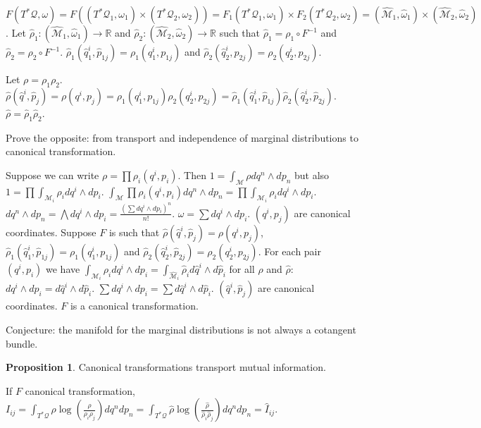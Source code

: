 \documentclass[smallextended]{svjour3}
\numberwithin{equation}{section}
\theoremstyle{definition}
\newtheorem{prop}[equation]{Proposition}
\begin{document}
$F(T^*\mathcal{Q}, \omega) = F((T^*\mathcal{Q}_1, \omega_1) \times (T^*\mathcal{Q}_2, \omega_2)) = F_1(T^*\mathcal{Q}_1, \omega_1) \times F_2(T^*\mathcal{Q}_2, \omega_2) = (\hat{\mathcal{M}}_1, \hat{\omega}_1) \times (\hat{\mathcal{M}}_2, \hat{\omega}_2)$.
Let $\hat{\rho}_1 : (\hat{\mathcal{M}}_1, \hat{\omega}_1) \rightarrow \mathbb{R}$ and $\hat{\rho}_2 : (\hat{\mathcal{M}}_2, \hat{\omega}_2) \rightarrow \mathbb{R}$ such that $\hat{\rho}_1 = \rho_1 \circ F^{-1 }$ and $\hat{\rho}_2 = \rho_2 \circ F^{-1 }$.  $\hat{\rho}_1(\hat{q}_1^i, \hat{p}_{1j})=\rho_1(q_1^i, p_{1j})$ and $\hat{\rho}_2(\hat{q}_2^i, \hat{p}_{2j})=\rho_2(q_2^i, p_{2j})$.

Let $\rho=\rho_1\rho_2$. $\hat{\rho}(\hat{q}^i, \hat{p}_j) =\rho(q^i, p_j)=\rho_1(q_1^i, p_{1j})\rho_2(q_2^i, p_{2j})=\hat{\rho}_1(\hat{q}_1^i, \hat{p}_{1j})\hat{\rho}_2(\hat{q}_2^i, \hat{p}_{2j})$. $\hat{\rho}=\hat{\rho}_1\hat{\rho}_2$.

Prove the opposite: from transport and independence of marginal distributions to canonical transformation.

Suppose we can write $\rho=\prod\rho_i(q^i,p_i)$. Then $1 = \int_{\mathcal{M}} \rho dq^n\wedge dp_n$ but also $1 = \prod \int_{\mathcal{M}_i} \rho_i dq^i\wedge dp_i$. $\int_{\mathcal{M}} \prod\rho_i(q^i,p_i) dq^n\wedge dp_n = \prod \int_{\mathcal{M}_i} \rho_i dq^i\wedge dp_i$. $dq^n\wedge dp_n = \bigwedge dq^i\wedge dp_i = \frac{(\sum dq^i\wedge dp_i)^n}{n!}$. $\omega = \sum dq^i\wedge dp_i$. $(q^i,p_j)$ are canonical coordinates. Suppose $F$ is such that $\hat{\rho}(\hat{q}^i, \hat{p}_j) = \rho(q^i, p_j)$, $\hat{\rho}_1(\hat{q}_1^i, \hat{p}_{1j})=\rho_1(q_1^i, p_{1j})$ and $\hat{\rho}_2(\hat{q}_2^i, \hat{p}_{2j})=\rho_2(q_2^i, p_{2j})$. For each pair $(q^i, p_i)$ we have $\int_{\mathcal{M}_i} \rho_i dq^i \wedge dp_i = \int_{\hat{\mathcal{M}}_i} \hat{\rho}_i d\hat{q}^i \wedge d\hat{p}_i$ for all $\rho$ and $\hat{\rho}$: $dq^i \wedge dp_i = d\hat{q}^i \wedge d\hat{p}_i$. $\sum dq^i \wedge dp_i = \sum d\hat{q}^i \wedge d\hat{p}_i$. $(\hat{q}^i,\hat{p}_j)$ are canonical coordinates. $F$ is a canonical transformation.

Conjecture: the manifold for the marginal distributions is not always a cotangent bundle.


\begin{prop}
	Canonical transformations transport mutual information.
\end{prop}

If $F$ canonical transformation, $I_{ij} = \int_{T^*\mathcal{Q}} \rho \log (\frac{\rho}{\rho_i \rho_j}) dq^n dp_n = \int_{T^*\mathcal{Q}} \hat{\rho} \log (\frac{\hat{\rho}}{\hat{\rho}_i \hat{\rho}_j}) dq^n dp_n = \hat{I}_{ij}$.
\end{document}
